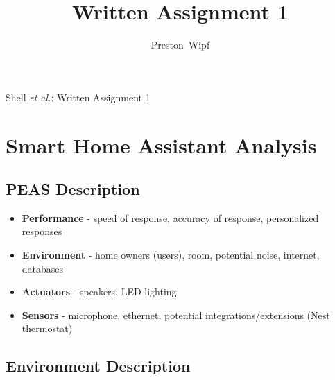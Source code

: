 \documentclass[journal]{IEEEtran}
\begin{document}
\onecolumn

\title{Written Assignment 1}
\author{Preston~Wipf}%

%
{Shell \MakeLowercase{\textit{et al.}}: Written Assignment 1}

\maketitle

\section{Smart Home Assistant Analysis}

\subsection{PEAS Description}

\begin{itemize}
\item \textbf{Performance} - speed of response, accuracy of response, personalized responses
\item \textbf{Environment} - home owners (users), room, potential noise, internet, databases
\item \textbf{Actuators} - speakers, LED lighting
\item \textbf{Sensors} - microphone, ethernet, potential integrations/extensions (Nest thermostat)
\end{itemize}

\subsection{Environment Description}
\end{document}
